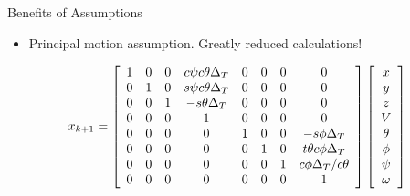 \documentclass[hyperref={pdfpagelabels=false}]{beamer}
\begin{document}
\begin{frame}{Benefits of Assumptions}
\begin{itemize}
\item Principal motion assumption. Greatly reduced calculations!
\end{itemize}
{\tiny
\begin{align*}
x_{k+1} = \left[\begin{array}{c c c c c c c c}
1 & 0 & 0 & c\psi c\theta \Delta_T & 0 & 0 & 0 & 0 \\
0 & 1 & 0 & s\psi c\theta \Delta_T & 0 & 0 & 0 & 0\\
0 & 0 & 1 & -s\theta \Delta_T & 0 & 0 & 0 & 0\\
0 & 0 & 0 & 1 & 0 & 0 & 0 & 0 \\
0 & 0 & 0 & 0 & 1 & 0 & 0 & -s\phi \Delta_T \\
0 & 0 & 0 & 0 & 0 & 1 & 0 & t\theta c\phi \Delta_T \\
0 & 0 & 0 & 0 & 0 & 0 & 1 & c\phi \Delta_T/c\theta \\
0 & 0 & 0 & 0 & 0 & 0 & 0 & 1
\end{array}\right]
\left[\begin{array}{c}
x \\ y \\ z \\ V \\ \theta \\ \phi \\ \psi \\ \omega
\end{array}\right]
\end{align*}
}
\end{frame}
\end{document}
